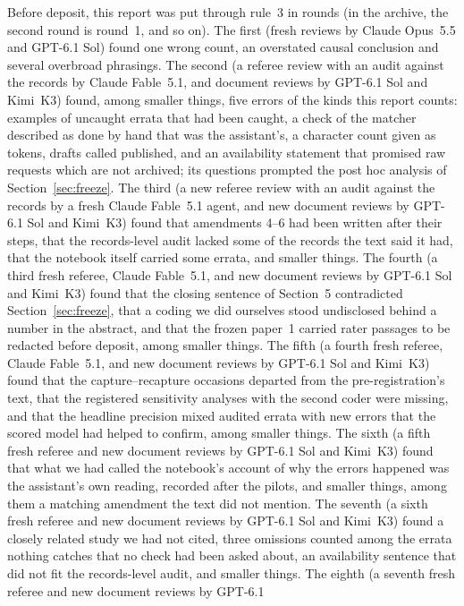 \documentclass[11pt]{article}
\begin{document}
Before deposit, this report was put through rule~3 in rounds (in the archive, the second round is round~1, and so on). The
first (fresh reviews by Claude Opus~5.5 and GPT-6.1 Sol)
found one wrong count, an overstated causal conclusion and several overbroad phrasings. The second (a referee review with an audit
against the records by Claude Fable~5.1, and document reviews by GPT-6.1 Sol and Kimi~K3) found, among smaller things, five errors
of the kinds this report counts: examples of uncaught errata that had been caught, a check of the matcher described as done by hand
that was the assistant's, a character count given as tokens, drafts called published, and an availability statement that promised
raw requests which are not archived; its questions prompted the post hoc analysis of Section~\ref{sec:freeze}. The third (a new
referee review with an audit against the records by a fresh Claude Fable~5.1 agent, and new document reviews by GPT-6.1 Sol and
Kimi~K3) found that amendments 4--6 had been written after their steps, that the records-level audit lacked some of the records
the text said it had, that the notebook itself carried some errata, and smaller things. The fourth (a third fresh referee, Claude Fable~5.1, and
new document reviews by GPT-6.1 Sol and Kimi~K3) found that the closing sentence of Section~5 contradicted Section~\ref{sec:freeze},
that a coding we did ourselves stood undisclosed behind a number in the abstract, and that the frozen paper~1 carried rater passages
to be redacted before deposit, among smaller things. The fifth (a fourth fresh referee, Claude Fable~5.1, and new document reviews
by GPT-6.1 Sol and Kimi~K3) found that the capture--recapture occasions departed from the pre-registration's text, that the
registered sensitivity analyses with the second coder were missing, and that the headline precision mixed audited errata with new
errors that the scored model had helped to confirm, among smaller things. The sixth (a fifth fresh referee and new
document reviews by GPT-6.1 Sol and Kimi~K3) found that what we had called the notebook's account of why the errors happened was
the assistant's own reading, recorded after the pilots, and smaller things, among them a matching amendment the text did not
mention. The seventh (a sixth fresh referee and new document reviews by GPT-6.1 Sol and Kimi~K3) found a closely related study we had
not cited, three omissions counted among the errata nothing catches that no check had been asked about, an availability sentence
that did not fit the records-level audit, and smaller things. The eighth (a seventh fresh referee and new document reviews by GPT-6.1
\end{document}
